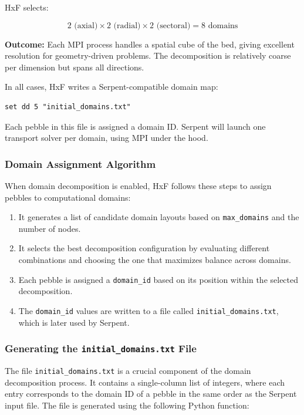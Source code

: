 \documentclass{article}
\begin{document}
HxF selects:

\[
2 \text{ (axial)} \times 2 \text{ (radial)} \times 2 \text{ (sectoral)} = 8 \text{ domains}
\]

\textbf{Outcome:} Each MPI process handles a spatial cube of the bed, giving excellent resolution for geometry-driven problems. The decomposition is relatively coarse per dimension but spans all directions.

\bigskip

\noindent
In all cases, HxF writes a Serpent-compatible domain map:
\begin{verbatim}
set dd 5 "initial_domains.txt"
\end{verbatim}
Each pebble in this file is assigned a domain ID. Serpent will launch one transport solver per domain, using MPI under the hood.


\subsubsection{Domain Assignment Algorithm}

When domain decomposition is enabled, HxF follows these steps to assign pebbles to computational domains:

\begin{enumerate}
    \item It generates a list of candidate domain layouts based on \texttt{max\_domains} and the number of nodes.
    \item It selects the best decomposition configuration by evaluating different combinations and choosing the one that maximizes balance across domains.
    \item Each pebble is assigned a \texttt{domain\_id} based on its position within the selected decomposition.
    \item The \texttt{domain\_id} values are written to a file called \texttt{initial\_domains.txt}, which is later used by Serpent.
\end{enumerate}

\subsubsection{Generating the \texttt{initial\_domains.txt} File}

The file \texttt{initial\_domains.txt} is a crucial component of the domain decomposition process. It contains a single-column list of integers, where each entry corresponds to the domain ID of a pebble in the same order as the Serpent input file. The file is generated using the following Python function:
\end{document}
